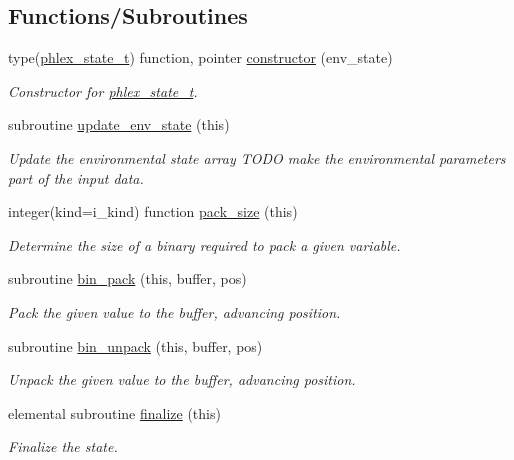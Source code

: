 \subsection*{Functions/\+Subroutines}
\begin{DoxyCompactItemize}
\item 
type(\mbox{\hyperlink{structpmc__phlex__state_1_1phlex__state__t}{phlex\+\_\+state\+\_\+t}}) function, pointer \mbox{\hyperlink{namespacepmc__phlex__state_af303f5284fd8e824bef403c5a1b93603}{constructor}} (env\+\_\+state)
\begin{DoxyCompactList}\small\item\em Constructor for \mbox{\hyperlink{structpmc__phlex__state_1_1phlex__state__t}{phlex\+\_\+state\+\_\+t}}. \end{DoxyCompactList}\item 
subroutine \mbox{\hyperlink{namespacepmc__phlex__state_aaf068a64f451138607dc89796065f06f}{update\+\_\+env\+\_\+state}} (this)
\begin{DoxyCompactList}\small\item\em Update the environmental state array T\+O\+DO make the environmental parameters part of the input data. \end{DoxyCompactList}\item 
integer(kind=i\+\_\+kind) function \mbox{\hyperlink{namespacepmc__phlex__state_a58739e1d06ecd1cfe62aa5463602dacd}{pack\+\_\+size}} (this)
\begin{DoxyCompactList}\small\item\em Determine the size of a binary required to pack a given variable. \end{DoxyCompactList}\item 
subroutine \mbox{\hyperlink{namespacepmc__phlex__state_ada3a9947f2dc64ffcd190bb17979fa47}{bin\+\_\+pack}} (this, buffer, pos)
\begin{DoxyCompactList}\small\item\em Pack the given value to the buffer, advancing position. \end{DoxyCompactList}\item 
subroutine \mbox{\hyperlink{namespacepmc__phlex__state_a9ee8fdc8ccba764c81837d8a00de6f80}{bin\+\_\+unpack}} (this, buffer, pos)
\begin{DoxyCompactList}\small\item\em Unpack the given value to the buffer, advancing position. \end{DoxyCompactList}\item 
elemental subroutine \mbox{\hyperlink{namespacepmc__phlex__state_abf02a2ecb17713c79ca09e71abbb7c07}{finalize}} (this)
\begin{DoxyCompactList}\small\item\em Finalize the state. \end{DoxyCompactList}\end{DoxyCompactItemize}


